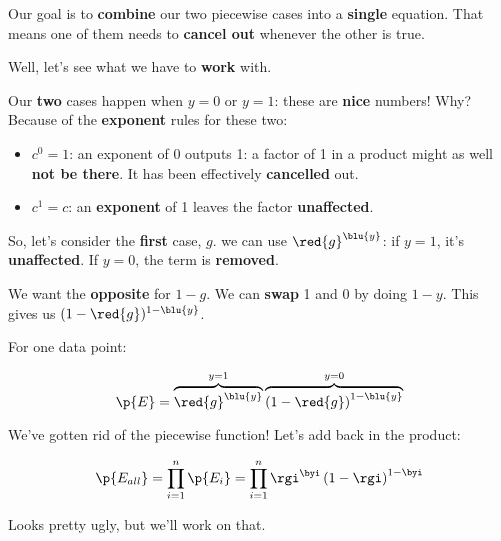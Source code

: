         Our goal is to \textbf{combine} our two piecewise cases into a \textbf{single} equation. That means one of them needs to \textbf{cancel out} whenever the other is true.
        
        Well, let's see what we have to \textbf{work} with.
        
        Our \textbf{two} cases happen when $y=0$ or $y=1$: these are \textbf{nice} numbers! Why? Because of the \textbf{exponent} rules for these two:
        
        \begin{itemize}
            \item $c^0=1$: an exponent of 0 outputs 1: a factor of 1 in a product might as well \textbf{not be there}. It has been effectively \textbf{cancelled} out.
            
            \item $c^1=c$: an \textbf{exponent} of 1 leaves the factor \textbf{unaffected}.
        \end{itemize}
        
        So, let's consider the \textbf{first} case, $g$. we can use $\red{g}^{ \blu{y} }$: if $y=1$, it's \textbf{unaffected}. If $y=0$, the term is \textbf{removed}.
        
        We want the \textbf{opposite} for $1-g$. We can \textbf{swap} 1 and 0 by doing $1-y$. This gives us $(1-\red{g})^{ 1-\blu{y} }$.
        
        For one data point:
        
        \begin{equation}
            \p{E} = 
            \overbrace{
                \red{g} ^ { \blu{y} } 
            }^{y=1}
            \overbrace{
                \left( 
                    1-\red{g} 
                \right) 
                ^ { 1-\blu{y} }
            }^{y=0}
        \end{equation}
        
        We've gotten rid of the piecewise function! Let's add back in the product:
        
        \begin{equation}
            \p{E_{all}} = 
            \prod_{i = 1}^n
            \p{E_i}
            =
            \prod_{i = 1}^n
            \rgi ^ {\byi}
            \left( 
                1-\rgi 
            \right) 
            ^ { 1 - \byi }
        \end{equation}
        
        Looks pretty ugly, but we'll work on that.
        
